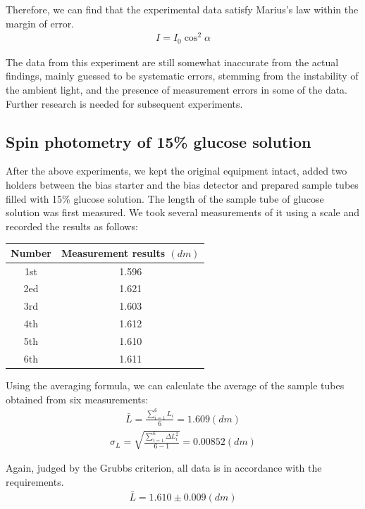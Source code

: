 \documentclass[UTF8]{article}
\begin{document}
Therefore, we can find that the experimental data satisfy Marius's law within the margin of error.
\begin{eqnarray}
	I=I_{0} \cos ^{2} \alpha 
\end{eqnarray}

The data from this experiment are still somewhat inaccurate from the actual findings, mainly guessed to be systematic errors, stemming from the instability of the ambient light, and the presence of measurement errors in some of the data. Further research is needed for subsequent experiments.

\subsection{Spin photometry of 15\% glucose solution}
After the above experiments, we kept the original equipment intact, added two holders between the bias starter and the bias detector and prepared sample tubes filled with 15\% glucose solution. The length of the sample tube of glucose solution was first measured. We took several measurements of it using a scale and recorded the results as follows:
	\begin{center}
	\begin{tabular}{cc}
		\toprule
		Number & Measurement results $\left ( dm \right ) $\\
		\midrule
		1st & 1.596 \\
		2ed & 1.621 \\
		3rd & 1.603 \\
		4th & 1.612\\
		5th & 1.610\\
		6th & 1.611 \\
		\bottomrule
	\end{tabular}
\end{center}

Using the averaging formula, we can calculate the average of the sample tubes obtained from six measurements:
\begin{eqnarray}
	\bar{L}  =  \frac{\sum_{i=1}^{6} L_{i} }{6}  =  1.609 \left ( dm \right )  
\end{eqnarray}
\begin{eqnarray}
	\sigma _{L} =  \sqrt{\frac{\sum_{i = 1}^{6} \Delta L_{i } ^{2}}{6-1} }  = 0.00852\left ( dm \right ) 
\end{eqnarray}

Again, judged by the Grubbs criterion, all data is in accordance with the requirements.
\begin{eqnarray}
	\bar{L}  =  1.610\pm 0.009\left ( dm \right )   
\end{eqnarray}
\end{document}
